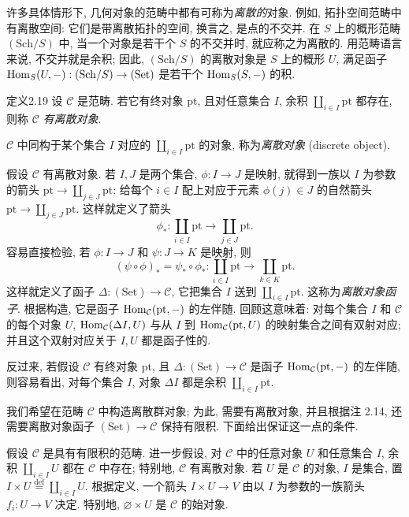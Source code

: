 许多具体情形下, 几何对象的范畴中都有可称为\emph{离散的}对象. 例如, 拓扑空间范畴中有离散空间: 它们是带离散拓扑的空间, 换言之, 是点的不交并. 在 $S$ 上的概形范畴 $(\mathrm{Sch}/S)$ 中, 当一个对象是若干个 $S$ 的不交并时, 就应称之为离散的. 用范畴语言来说, 不交并就是余积; 因此, $(\mathrm{Sch}/S)$ 的离散对象是 $S$ 上的概形 $U$, 满足函子 $\operatorname{Hom}_S(U,-):(\mathrm{Sch}/S)\to(\mathrm{Set})$ 是若干个 $\operatorname{Hom}_S(S,-)$ 的积.

\begin{origstatement}{定义}{2.19}\label{ch02:def219}
设 $\mathcal C$ 是范畴. 若它有终对象 $\mathrm{pt}$, 且对任意集合 $I$, 余积 $\coprod_{i\in I}\mathrm{pt}$ 都存在, 则称 $\mathcal C$ \emph{有离散对象}.

$\mathcal C$ 中同构于某个集合 $I$ 对应的 $\coprod_{i\in I}\mathrm{pt}$ 的对象, 称为\emph{离散对象} (discrete object).
\end{origstatement}

假设 $\mathcal C$ 有离散对象. 若 $I,J$ 是两个集合, $\phi:I\to J$ 是映射, 就得到一族以 $I$ 为参数的箭头 $\mathrm{pt}\to\coprod_{j\in J}\mathrm{pt}$: 给每个 $i\in I$ 配上对应于元素 $\phi(j)\in J$ 的自然箭头 $\mathrm{pt}\to\coprod_{j\in J}\mathrm{pt}$. 这样就定义了箭头
\[
\phi_*:\coprod_{i\in I}\mathrm{pt}\longrightarrow\coprod_{j\in J}\mathrm{pt}.
\]
容易直接检验, 若 $\phi:I\to J$ 和 $\psi:J\to K$ 是映射, 则
\[
(\psi\circ\phi)_*=\psi_*\circ\phi_*:\coprod_{i\in I}\mathrm{pt}\longrightarrow\coprod_{k\in K}\mathrm{pt}.
\]
这样就定义了函子 $\Delta:(\mathrm{Set})\to\mathcal C$, 它把集合 $I$ 送到 $\coprod_{i\in I}\mathrm{pt}$. 这称为\emph{离散对象函子}. 根据构造, 它是函子 $\operatorname{Hom}_{\mathcal C}(\mathrm{pt},-)$ 的左伴随. 回顾这意味着: 对每个集合 $I$ 和 $\mathcal C$ 的每个对象 $U$, $\operatorname{Hom}_{\mathcal C}(\Delta I,U)$ 与从 $I$ 到 $\operatorname{Hom}_{\mathcal C}(\mathrm{pt},U)$ 的映射集合之间有双射对应; 并且这个双射对应关于 $I,U$ 都是函子性的.

反过来, 若假设 $\mathcal C$ 有终对象 $\mathrm{pt}$, 且 $\Delta:(\mathrm{Set})\to\mathcal C$ 是函子 $\operatorname{Hom}_{\mathcal C}(\mathrm{pt},-)$ 的左伴随, 则容易看出, 对每个集合 $I$, 对象 $\Delta I$ 都是余积 $\coprod_{i\in I}\mathrm{pt}$.

我们希望在范畴 $\mathcal C$ 中构造离散群对象; 为此, 需要有离散对象, 并且根据注 2.14, 还需要离散对象函子 $(\mathrm{Set})\to\mathcal C$ 保持有限积. 下面给出保证这一点的条件.

假设 $\mathcal C$ 是具有有限积的范畴. 进一步假设, 对 $\mathcal C$ 中的任意对象 $U$ 和任意集合 $I$, 余积 $\coprod_{i\in I}U$ 都在 $\mathcal C$ 中存在; 特别地, $\mathcal C$
有离散对象. 若 $U$ 是 $\mathcal C$ 的对象, $I$ 是集合, 置 $I\times U\overset{\mathrm{def}}=\coprod_{i\in I}U$. 根据定义, 一个箭头 $I\times U\to V$ 由以 $I$ 为参数的一族箭头 $f_i:U\to V$ 决定. 特别地, $\varnothing\times U$ 是 $\mathcal C$ 的始对象.

